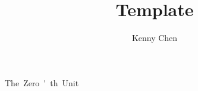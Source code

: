 \documentclass[12pt]{report}
\title{Template}
\author{Kenny Chen}
\begin{document}
\maketitle
\tableofcontents
\newpage

\unit{The Zero'th Unit}

\end{document}
